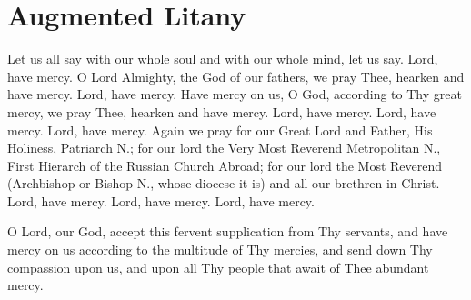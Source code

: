\section{Augmented Litany}

\begin{liturgicaltext}
    \deacon Let us all say with our whole soul and with our whole mind, let us say.
    \choir Lord, have mercy.
    \deacon O Lord Almighty, the God of our fathers, we pray Thee, hearken and have mercy.
    \choir Lord, have mercy.
    \deacon Have mercy on us, O God, according to Thy great mercy, we pray Thee, hearken and have mercy.
    \choir Lord, have mercy. Lord, have mercy. Lord, have mercy.
    \deacon Again we pray for our Great Lord and Father, His Holiness, Patriarch N.; for our lord the Very Most Reverend Metropolitan N., First Hierarch of the Russian Church Abroad; for our lord the Most Reverend (Archbishop or Bishop N., whose diocese it is) and all our brethren in Christ.
    \choirsemisecret Lord, have mercy. Lord, have mercy. Lord, have mercy. 
\end{liturgicaltext}
\begin{semisecret}
    \begin{secretprayer}
        O Lord, our God, accept this fervent supplication from Thy servants, and have mercy on us according to the multitude of Thy mercies, and send down Thy compassion upon us, and upon all Thy people that await of Thee abundant mercy.
    \end{secretprayer}
\end{semisecret}
